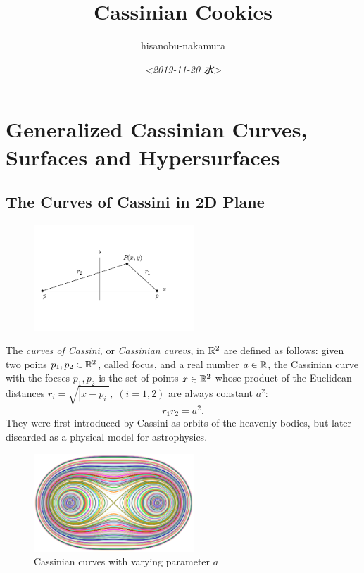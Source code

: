 \documentclass{article}
\author{hisanobu-nakamura}
\date{\textit{<2019-11-20 水>}}
\title{Cassinian Cookies}
\begin{document}
\maketitle
\tableofcontents


\section{Generalized Cassinian Curves, Surfaces and Hypersurfaces}
\label{sec-1}
\subsection{The Curves of Cassini in 2D Plane}
\label{sec-1-1}
\begin{figure}[h]
\begin{center}
\includegraphics[width=6cm]{images/cassini_generic_point.png}
\caption{}
\label{ }
\end{center}
\end{figure}
The \emph{curves of Cassini}, or \emph{Cassinian curevs}, in $\mathbb R^2$ are defined as follows: given two poins $p_1, p_2 \in \mathbb R^2$, called focus, and a real number $a \in \mathbb R$, 
the Cassinian curve with the focses $p_{1},p_{2}$ is the set of points $x \in \mathbb R^2$ whose product of the Euclidean distances $r_i = \sqrt{|x-p_i|}, \; (i=1,2)$ are always constant $a^2$:
\begin{equation}
\label{ }
r_1 r_2 = a^2.
\end{equation}
They were first introduced by Cassini as orbits of the heavenly bodies, but later discarded as a physical model for astrophysics.
\begin{figure}[h]
\begin{center}
\includegraphics[width=6cm]{images/cassini2.eps}
\caption{Cassinian curves with varying parameter $a$}
\label{ }
\end{center}
\end{figure}
\end{document}
